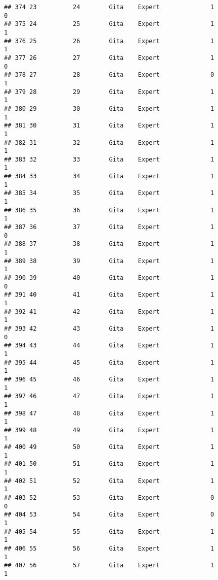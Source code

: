 \documentclass[
]{article}
\begin{document}
\begin{verbatim}
## 374 23          24        Gita    Expert              1                 0
## 375 24          25        Gita    Expert              1                 1
## 376 25          26        Gita    Expert              1                 1
## 377 26          27        Gita    Expert              1                 0
## 378 27          28        Gita    Expert              0                 1
## 379 28          29        Gita    Expert              1                 1
## 380 29          30        Gita    Expert              1                 1
## 381 30          31        Gita    Expert              1                 1
## 382 31          32        Gita    Expert              1                 1
## 383 32          33        Gita    Expert              1                 1
## 384 33          34        Gita    Expert              1                 1
## 385 34          35        Gita    Expert              1                 1
## 386 35          36        Gita    Expert              1                 1
## 387 36          37        Gita    Expert              1                 0
## 388 37          38        Gita    Expert              1                 1
## 389 38          39        Gita    Expert              1                 1
## 390 39          40        Gita    Expert              1                 0
## 391 40          41        Gita    Expert              1                 1
## 392 41          42        Gita    Expert              1                 1
## 393 42          43        Gita    Expert              1                 0
## 394 43          44        Gita    Expert              1                 1
## 395 44          45        Gita    Expert              1                 1
## 396 45          46        Gita    Expert              1                 1
## 397 46          47        Gita    Expert              1                 1
## 398 47          48        Gita    Expert              1                 1
## 399 48          49        Gita    Expert              1                 1
## 400 49          50        Gita    Expert              1                 1
## 401 50          51        Gita    Expert              1                 1
## 402 51          52        Gita    Expert              1                 1
## 403 52          53        Gita    Expert              0                 0
## 404 53          54        Gita    Expert              0                 1
## 405 54          55        Gita    Expert              1                 1
## 406 55          56        Gita    Expert              1                 1
## 407 56          57        Gita    Expert              1                 1

\end{verbatim}
\end{document}
